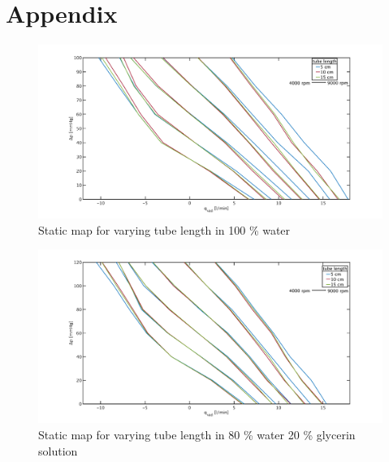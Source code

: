 \chapter{Appendix}
\begin{figure}[ht]
  \includegraphics[width=\textwidth]{images/chapt_4/100w_tube_length_new.pdf}
  \caption[Static map for different tube length in 100 \% water]{Static map for varying tube length in 100 \% water}
  \label{fig:anh_1}
\end{figure}

\begin{figure}[ht]
  \includegraphics[width=\textwidth]{images/chapt_4/80w20g_tube_length_new.pdf}
  \caption[Static map for different tube length in 80 \% water 20 \% glycerin solution]{Static map for varying tube length in 80 \% water 20 \% glycerin solution}
 \label{fig:anh_2}
\end{figure}

